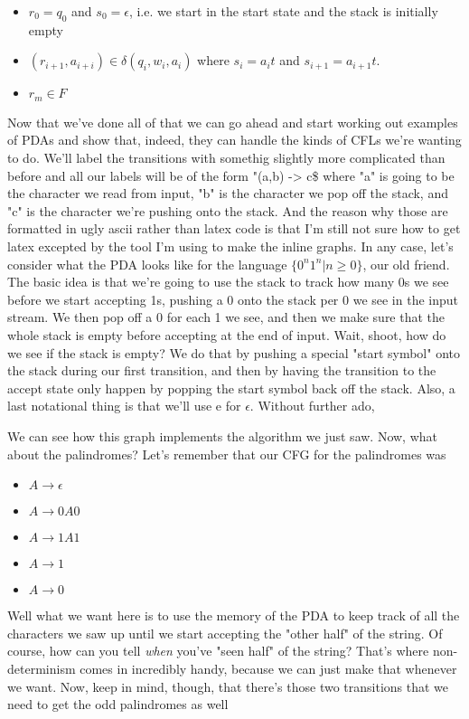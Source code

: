 \documentclass[11pt]{article}
\begin{document}
\begin{itemize}
\item $r_0 = q_0$ and $s_0 = \epsilon$, i.e. we start in the start state and the stack is initially empty
\item $(r_{i+1},a_{i+i}) \in \delta(q_i,w_i,a_i)$ where $s_i = a_i t$ and $s_{i+1} = a_{i+1} t$.
\item $r_m \in F$
\end{itemize}

Now that we've done all of that we can go ahead and start working out examples of PDAs and show that, indeed, they can handle the kinds of CFLs we're wanting to do. We'll label the transitions with somethig slightly more complicated than before and all our labels will be of the form "(a,b) -> c\$ where "a" is going to be the character we read from input, "b" is the character we pop off the stack, and "c" is the character we're pushing onto the stack. And the reason why those are formatted in ugly ascii rather than latex code is that I'm still not sure how to get latex excepted by the tool I'm using to make the inline graphs. In any case, let's consider what the PDA looks like for the language $\{0^n1^n | n \geq 0\}$, our old friend. The basic idea is that we're going to use the stack to track how many 0s we see before we start accepting 1s, pushing a 0 onto the stack per 0 we see in the input stream. We then pop off a 0 for each 1 we see, and then we make sure that the whole stack is empty before accepting at the end of input. Wait, shoot, how do we see if the stack is empty? We do that by pushing a special "start symbol" onto the stack during our first transition, and then by having the transition to the accept state only happen by popping the start symbol back off the stack. Also, a last notational thing is that we'll use e for $\epsilon$. Without further ado,

We can see how this graph implements the algorithm we just saw. Now, what about the palindromes? Let's remember that our CFG for the palindromes was

\begin{itemize}
\item $A \to \epsilon$
\item $A \to 0A0$
\item $A \to 1A1$
\item $A \to 1$
\item $A \to 0$
\end{itemize}

Well what we want here is to use the memory of the PDA to keep track of all the characters we saw up until we start accepting the "other half" of the string. Of course, how can you tell \emph{when} you've "seen half" of the string? That's where non-determinism comes in incredibly handy, because we can just make that whenever we want. Now, keep in mind, though, that there's those two transitions that we need to get the odd palindromes as well
\end{document}
